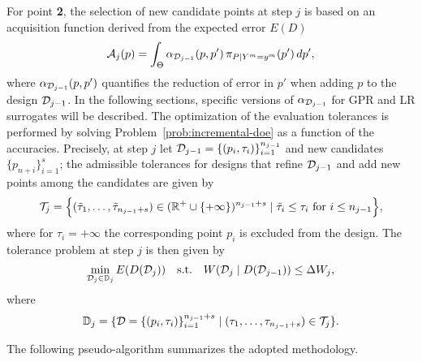 For point \textbf{2}, the selection of new candidate points at step $j$ is based on an acquisition function derived from the expected error $E(D)$
\begin{equation}\label{eq:acq-fun-gen}
    \mathcal A_j(p) = \int_{\Theta} \alpha_{\mathcal D_{j-1}}(p, p') \, \pi_{P \mid Y^m = y^m}(p') \, dp',
\end{equation}
where $\alpha_{\mathcal D_{j-1}}(p, p')$ quantifies the reduction of error in $p'$ when adding $p$ to the design $\mathcal D_{j-1}$. 
In the following sections, specific versions of $\alpha_{\mathcal D_{j-1}}$ for GPR and LR surrogates will be described. \newline
The optimization of the evaluation tolerances is performed by solving Problem~\ref{prob:incremental-doe} as a function of the accuracies.
Precisely, at step $j$ let $\mathcal D_{j-1} = \{ (p_i, \tau_i) \}_{i=1}^{n_{j-1}}$ and new candidates $\{ p_{n+i} \}_{i=1}^{s}$; the admissible tolerances for designs that refine $\mathcal D_{j-1}$ and add new points among the candidates are given by
\begin{equation*}
    \mathcal T_j =  \Big \{ (\tilde \tau _1, \dots, \tilde \tau _{n_{j-1}+s}) \in ( \mathbb{R} ^+ \cup \{ +\infty \} ) ^{n_{j-1}+s} \mid \tilde \tau_i  \leq \tau_ i \text{ for } i \leq n_{j-1}\Big \},
\end{equation*}
where for $\tau_i = +\infty$ the corresponding point $p_i$ is excluded from the design.
The tolerance problem at step $j$ is then given by
\begin{equation} \label{prob:tolerance-doe}
    \min_{\mathcal D_{j} \in \mathbb D_j} E(D(\mathcal D_{j})) \quad \text{s.t.} 
    \quad W(\mathcal D_{j} \mid D(\mathcal D_{j-1}) ) \le \Delta W_j, 
\end{equation} 
where \[
\mathbb D_j = \{ \mathcal D = \{ (p_i, \tau_i) \}_{i=1}^{n_{j-1}+s} \mid (\tau_1, \dots, \tau_{n_{j-1}+s}) \in \mathcal T_j \}.
\]
\newpage

The following pseudo-algorithm summarizes the adopted methodology. \medskip

